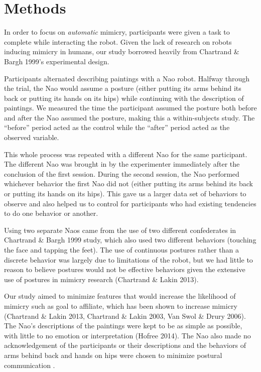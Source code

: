 \documentclass{acm_proc_article-sp}
\begin{document}
\section{Methods} 
In order to focus on \textit{automatic} mimicry, participants were given a task to complete while interacting the robot. Given the lack of research on robots inducing mimicry in humans, our study borrowed heavily from Chartrand \& Bargh 1999's experimental design. 

Participants alternated describing paintings with a Nao robot. Halfway through the trial, the Nao would assume a posture (either putting its arms behind its back or putting its hands on its hips) while continuing with the description of paintings. We measured the time the participant assumed the posture both before and after the Nao assumed the posture, making this a within-subjects study. The ``before'' period acted as the control while the ``after'' period acted as the observed variable.

This whole process was repeated with a different Nao for the same participant. The different Nao was brought in by the experimenter immediately after the conclusion of the first session. During the second session, the Nao performed whichever behavior the first Nao did not (either putting its arms behind its back or putting its hands on its hips). This gave us a larger data set of behaviors to observe and also helped us to control for participants who had existing tendencies to do one behavior or another.

Using two separate Naos came from the use of two different confederates in Chartrand \& Bargh 1999 study, which also used two different behaviors (touching the face and tapping the feet). The use of continuous postures rather than a discrete behavior was largely due to limitations of the robot, but we had little to reason to believe postures would not be effective behaviors given the extensive use of postures in mimicry research (Chartrand \& Lakin 2013). 

Our study aimed to minimize features that would increase the likelihood of mimicry such as goal to affiliate, which has been shown to increase mimicry (Chartrand \& Lakin 2013, Chartrand \& Lakin 2003, Van Swol \& Drury 2006). The Nao's descriptions of the paintings were kept to be as simple as possible, with little to no emotion or interpretation (Hofree 2014). The Nao also made no acknowledgement of the participants or their descriptions and the behaviors of arms behind back and hands on hips were chosen to minimize postural communication . 
\end{document}
